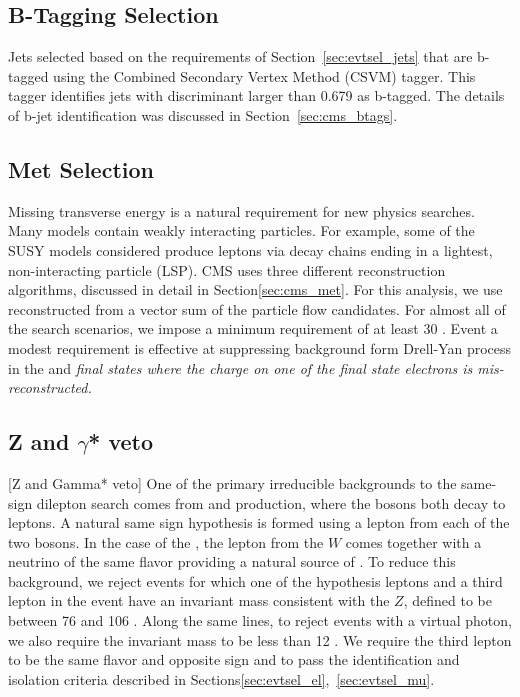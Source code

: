 \subsection{B-Tagging Selection}
\label{sec:evtsel_btag}
Jets selected based on the requirements of Section~\ref{sec:evtsel_jets} that
are b-tagged using the Combined Secondary Vertex Method (CSVM) tagger. This
tagger identifies jets with discriminant larger than 0.679 as b-tagged. The
details of b-jet identification was discussed in Section~\ref{sec:cms_btags}.

\subsection{Met Selection}
\label{sec:evtsel_met}
Missing transverse energy is a natural requirement for new physics searches.
Many models contain weakly interacting particles. For example, some of the
SUSY models considered produce leptons via decay chains ending in a lightest,
non-interacting particle (LSP). CMS uses three different \met reconstruction
algorithms, discussed in detail in Section\ref{sec:cms_met}. For this analysis,
we use \met reconstructed from a vector sum of the particle flow candidates.
For almost all of the search scenarios, we impose a minimum \met requirement of
at least 30 \GeV. Event a modest \met requirement is effective at suppressing
background form Drell-Yan process in the \ee and \em final states where the
charge on one of the final state electrons is mis-reconstructed.

\subsection{Z and $\gamma$* veto}[Z and Gamma* veto]
\label{sec:evtsel_zveto}
One of the primary irreducible backgrounds to the same-sign dilepton search
comes from \WZ and \ZZ production, where the bosons both decay to leptons.
A natural same sign hypothesis is formed using a lepton from each of the
two bosons. In the case of the \WZ, the lepton from the $W$ comes together
with a neutrino of the same flavor providing a natural source of \met. To
reduce this background, we reject events for which one of the hypothesis
leptons and a third lepton in the event have an invariant mass consistent
with the $Z$, defined to be between 76 and 106 \GeV. Along the same lines, to
reject events with a virtual photon, we also require the invariant mass to
be less than 12 \GeV. We require the third lepton to be the same flavor and
opposite sign and to pass the identification and isolation criteria described
in Sections\ref{sec:evtsel_el},~\ref{sec:evtsel_mu}.

